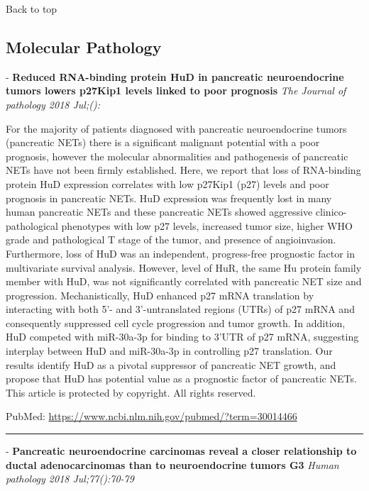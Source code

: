 \documentclass[]{article}
\begin{document}
Back to top

\pagebreak

\hypertarget{molecular-pathology}{%
\subsection{Molecular Pathology}\label{molecular-pathology}}

 - \textbf{Reduced RNA-binding protein HuD in pancreatic neuroendocrine
tumors lowers p27Kip1 levels linked to poor prognosis} \emph{The Journal
of pathology 2018 Jul;():}

For the majority of patients diagnosed with pancreatic neuroendocrine
tumors (pancreatic NETs) there is a significant malignant potential with
a poor prognosis, however the molecular abnormalities and pathogenesis
of pancreatic NETs have not been firmly established. Here, we report
that loss of RNA-binding protein HuD expression correlates with low
p27Kip1 (p27) levels and poor prognosis in pancreatic NETs. HuD
expression was frequently lost in many human pancreatic NETs and these
pancreatic NETs showed aggressive clinico-pathological phenotypes with
low p27 levels, increased tumor size, higher WHO grade and pathological
T stage of the tumor, and presence of angioinvasion. Furthermore, loss
of HuD was an independent, progress-free prognostic factor in
multivariate survival analysis. However, level of HuR, the same Hu
protein family member with HuD, was not significantly correlated with
pancreatic NET size and progression. Mechanistically, HuD enhanced p27
mRNA translation by interacting with both 5'- and 3'-untranslated
regions (UTRs) of p27 mRNA and consequently suppressed cell cycle
progression and tumor growth. In addition, HuD competed with miR-30a-3p
for binding to 3'UTR of p27 mRNA, suggesting interplay between HuD and
miR-30a-3p in controlling p27 translation. Our results identify HuD as a
pivotal suppressor of pancreatic NET growth, and propose that HuD has
potential value as a prognostic factor of pancreatic NETs. This article
is protected by copyright. All rights reserved.

PubMed: \url{https://www.ncbi.nlm.nih.gov/pubmed/?term=30014466}

{}

{}

\begin{center}\rule{0.5\linewidth}{\linethickness}\end{center}

 - \textbf{Pancreatic neuroendocrine carcinomas reveal a closer
relationship to ductal adenocarcinomas than to neuroendocrine tumors G3}
\emph{Human pathology 2018 Jul;77():70-79}
\end{document}
